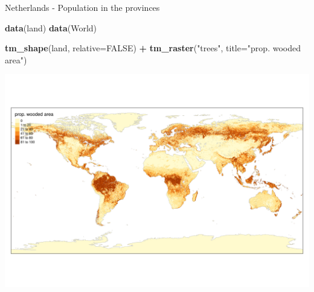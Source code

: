 \documentclass[
  ignorenonframetext,
]{beamer}
\newenvironment{Shaded}{\begin{snugshade}}{\end{snugshade}}
\newcommand{\DataTypeTok}[1]{\textcolor[rgb]{0.13,0.29,0.53}{#1}}
\newcommand{\KeywordTok}[1]{\textcolor[rgb]{0.13,0.29,0.53}{\textbf{#1}}}
\newcommand{\NormalTok}[1]{#1}
\newcommand{\OperatorTok}[1]{\textcolor[rgb]{0.81,0.36,0.00}{\textbf{#1}}}
\newcommand{\OtherTok}[1]{\textcolor[rgb]{0.56,0.35,0.01}{#1}}
\newcommand{\StringTok}[1]{\textcolor[rgb]{0.31,0.60,0.02}{#1}}
\begin{document}
\begin{frame}[fragile]{Netherlands - Population in the provinces}
\protect\hypertarget{netherlands---population-in-the-provinces}{}
\begin{Shaded}
\begin{Highlighting}[]
\KeywordTok{data}\NormalTok{(land)}
\KeywordTok{data}\NormalTok{(World)}
\end{Highlighting}
\end{Shaded}

\begin{Shaded}
\begin{Highlighting}[]
\KeywordTok{tm\_shape}\NormalTok{(land,  }\DataTypeTok{relative=}\OtherTok{FALSE}\NormalTok{) }\OperatorTok{+}
\StringTok{    }\KeywordTok{tm\_raster}\NormalTok{(}\StringTok{"trees"}\NormalTok{, }\DataTypeTok{title=}\StringTok{"prop. wooded area"}\NormalTok{)}
\end{Highlighting}
\end{Shaded}

\includegraphics{quick_high_quality_maps_files/figure-beamer/unnamed-chunk-15-1.pdf}
\end{frame}
\end{document}
